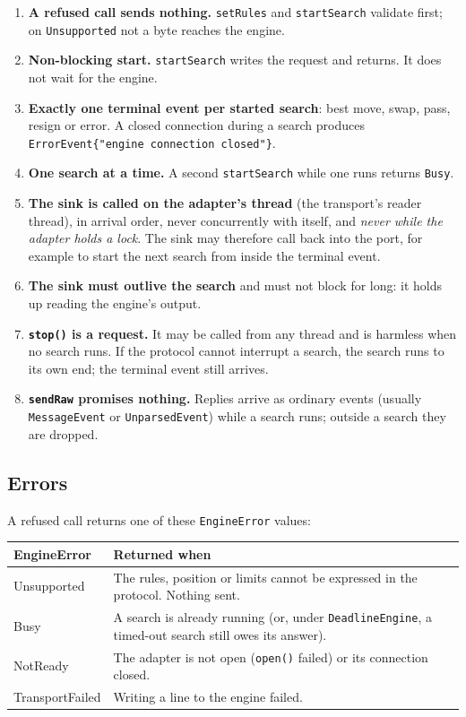 \documentclass[11pt,a4paper]{article}
\newcommand{\code}[1]{\texttt{#1}}
\begin{document}
\begin{enumerate}
  \item \textbf{A refused call sends nothing.} \code{setRules} and \code{startSearch} validate
        first; on \code{Unsupported} not a byte reaches the engine.
  \item \textbf{Non-blocking start.} \code{startSearch} writes the request and returns. It does not
        wait for the engine.
  \item \textbf{Exactly one terminal event per started search}: best move, swap, pass, resign or
        error. A closed connection during a search produces
        \code{ErrorEvent\{"engine connection closed"\}}.
  \item \textbf{One search at a time.} A second \code{startSearch} while one runs returns
        \code{Busy}.
  \item \textbf{The sink is called on the adapter's thread} (the transport's reader thread), in
        arrival order, never concurrently with itself, and \emph{never while the adapter holds a
        lock}. The sink may therefore call back into the port, for example to start the next
        search from inside the terminal event.
  \item \textbf{The sink must outlive the search} and must not block for long: it holds up reading
        the engine's output.
  \item \textbf{\code{stop()} is a request.} It may be called from any thread and is harmless when
        no search runs. If the protocol cannot interrupt a search, the search runs to its own end;
        the terminal event still arrives.
  \item \textbf{\code{sendRaw} promises nothing.} Replies arrive as ordinary events (usually
        \code{MessageEvent} or \code{UnparsedEvent}) while a search runs; outside a search they
        are dropped.
\end{enumerate}

\subsection{Errors}

A refused call returns one of these \code{EngineError} values:

\begin{center}
\small
\begin{tabularx}{\textwidth}{@{}>{\ttfamily}l X@{}}
\toprule
\normalfont\textbf{EngineError} & \textbf{Returned when} \\
\midrule
Unsupported     & The rules, position or limits cannot be expressed in the protocol. Nothing sent. \\
Busy            & A search is already running (or, under \code{DeadlineEngine}, a timed-out search
                  still owes its answer). \\
NotReady        & The adapter is not open (\code{open()} failed) or its connection closed. \\
TransportFailed & Writing a line to the engine failed. \\
\bottomrule
\end{tabularx}
\end{center}
\end{document}
